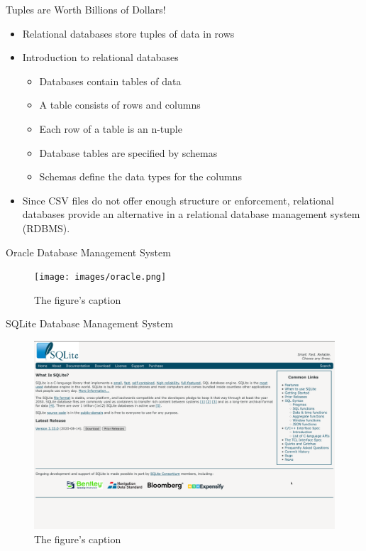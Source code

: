 \documentclass[14pt,aspectratio=169]{beamer}
\begin{document}
%
\begin{frame}{Tuples are Worth Billions of Dollars!}
  \begin{itemize}
    \item Relational databases store tuples of data in rows
      \vspace*{-.15in}
    \item Introduction to relational databases
      \begin{itemize}
        \item Databases contain tables of data
        \item A table consists of rows and columns
        \item Each row of a table is an n-tuple
        \item Database tables are specified by schemas
        \item Schemas define the data types for the columns
      \end{itemize}
      \vspace*{-.2in}
    \item Since CSV files do not offer enough structure or enforcement,
      relational databases provide an alternative in a relational database
      management system (RDBMS).
  \end{itemize}
\end{frame}

%
\begin{frame}{Oracle Database Management System}
  \begin{figure}
    \centering
    \texttt{[image: images/oracle.png]}
    \caption{The figure's caption}
  \end{figure}
\end{frame}

%
\begin{frame}{SQLite Database Management System}
  \begin{figure}
    \centering
    \includegraphics[scale=.0825]{images/sqlite.png}
    \caption{The figure's caption}
  \end{figure}
\end{frame}
\end{document}
